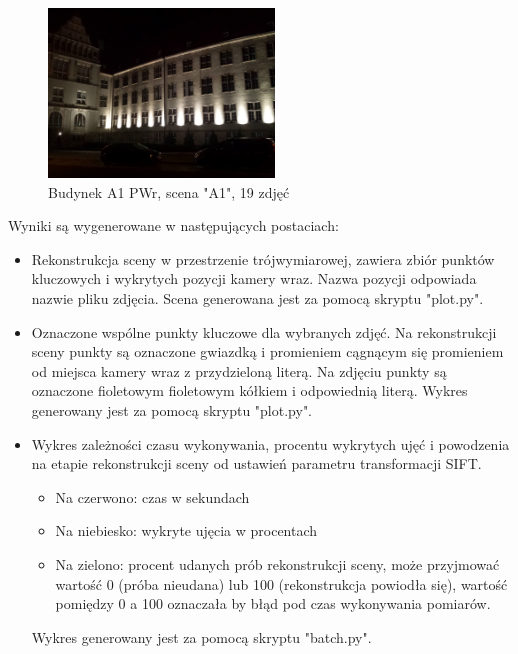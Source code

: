 \begin{figure}[h]
   \centering
   \includegraphics[width=6cm]{img/A1.jpg}
   \caption{Budynek A1 PWr, scena "A1", 19 zdjęć}
   \label {fig:scene_A1}
\end{figure}

Wyniki są wygenerowane w następujących postaciach:
\begin{itemize}
   \item Rekonstrukcja sceny w przestrzenie trójwymiarowej, zawiera zbiór punktów kluczowych i wykrytych pozycji kamery wraz. Nazwa pozycji odpowiada nazwie pliku zdjęcia. Scena generowana jest za pomocą skryptu "plot.py".
   \item Oznaczone wspólne punkty kluczowe dla wybranych zdjęć. Na rekonstrukcji sceny punkty są oznaczone gwiazdką i promieniem cągnącym się promieniem od miejsca kamery wraz z przydzieloną literą. Na zdjęciu punkty są oznaczone fioletowym fioletowym kółkiem i odpowiednią literą. Wykres generowany jest za pomocą skryptu "plot.py".
   \item Wykres zależności czasu wykonywania, procentu wykrytych ujęć i powodzenia na etapie rekonstrukcji sceny od ustawień parametru transformacji SIFT.
   \begin{itemize}
      \item  Na czerwono: czas w sekundach
      \item  Na niebiesko: wykryte ujęcia w procentach
      \item  Na zielono: procent udanych prób rekonstrukcji sceny, może przyjmować wartość 0 (próba nieudana) lub 100 (rekonstrukcja powiodła się), wartość pomiędzy 0 a 100 oznaczała by błąd pod czas wykonywania pomiarów.
   \end{itemize}
    Wykres generowany jest za pomocą skryptu "batch.py".
\end{itemize}

